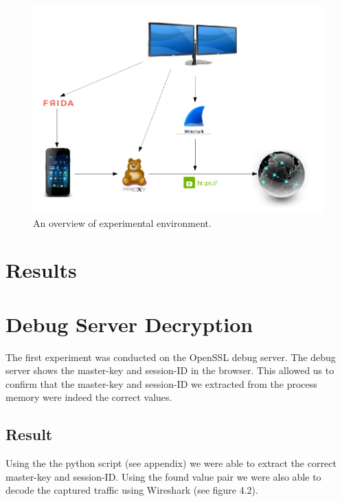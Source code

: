\documentclass[12pt, a4paper]{report}
\begin{document}
\begin{figure}[h]
  \includegraphics[width=\linewidth]{images/diagram.png}
  \caption{An overview of experimental environment.}
\end{figure}

\clearpage

\section{Results}



\section{Debug Server Decryption}

The first experiment was conducted on the OpenSSL debug server. The debug server shows the master-key and session-ID in the browser. This allowed us to confirm that the master-key and session-ID we extracted from the process memory were indeed the correct values.

\subsection{Result}
Using the the python script (see appendix) we were able to extract the correct master-key and session-ID. Using the found value pair we were also able to decode the captured traffic using Wireshark (see figure 4.2).
\end{document}
